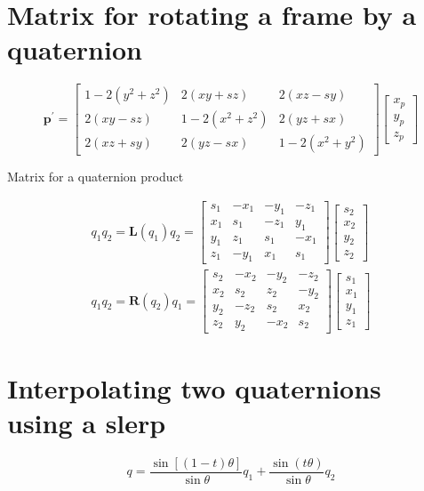 \documentclass[10pt]{article}
\begin{document}
\section{Matrix for rotating a frame by a quaternion}
$$
\mathbf{p}^{\prime}=\left[\begin{array}{ccc}
1-2\left(y^{2}+z^{2}\right) & 2(x y+s z) & 2(x z-s y) \\
2(x y-s z) & 1-2\left(x^{2}+z^{2}\right) & 2(y z+s x) \\
2(x z+s y) & 2(y z-s x) & 1-2\left(x^{2}+y^{2}\right)
\end{array}\right]\left[\begin{array}{c}
x_{p} \\
y_{p} \\
z_{p}
\end{array}\right]
$$

Matrix for a quaternion product

$$
\begin{gathered}
q_{1} q_{2}=\mathbf{L}\left(q_{1}\right) q_{2}=\left[\begin{array}{cccc}
s_{1} & -x_{1} & -y_{1} & -z_{1} \\
x_{1} & s_{1} & -z_{1} & y_{1} \\
y_{1} & z_{1} & s_{1} & -x_{1} \\
z_{1} & -y_{1} & x_{1} & s_{1}
\end{array}\right]\left[\begin{array}{l}
s_{2} \\
x_{2} \\
y_{2} \\
z_{2}
\end{array}\right] \\
q_{1} q_{2}=\mathbf{R}\left(q_{2}\right) q_{1}=\left[\begin{array}{cccc}
s_{2} & -x_{2} & -y_{2} & -z_{2} \\
x_{2} & s_{2} & z_{2} & -y_{2} \\
y_{2} & -z_{2} & s_{2} & x_{2} \\
z_{2} & y_{2} & -x_{2} & s_{2}
\end{array}\right]\left[\begin{array}{l}
s_{1} \\
x_{1} \\
y_{1} \\
z_{1}
\end{array}\right]
\end{gathered}
$$

\section{Interpolating two quaternions using a slerp}
$$
q=\frac{\sin [(1-t) \theta]}{\sin \theta} q_{1}+\frac{\sin (t \theta)}{\sin \theta} q_{2}
$$
\end{document}

